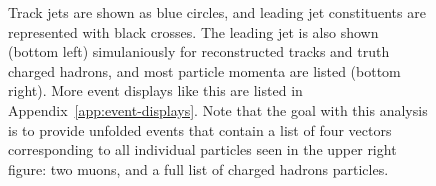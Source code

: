 \begin{figure}[h!]
{    Track jets are shown as blue circles, and leading jet constituents are represented with black crosses.
    The leading jet is also shown (bottom left) simulaniously for reconstructed tracks and truth charged hadrons, and most particle momenta are listed (bottom right).
    More event displays like this are listed in Appendix~\ref{app:event-displays}. 
    Note that the goal with this analysis is to provide unfolded events that contain a list of four vectors corresponding to all individual particles seen in the upper right figure: two muons, and a full list of charged hadrons particles.}
  \label{fig:EventDisplay}
\end{figure}

\clearpage
